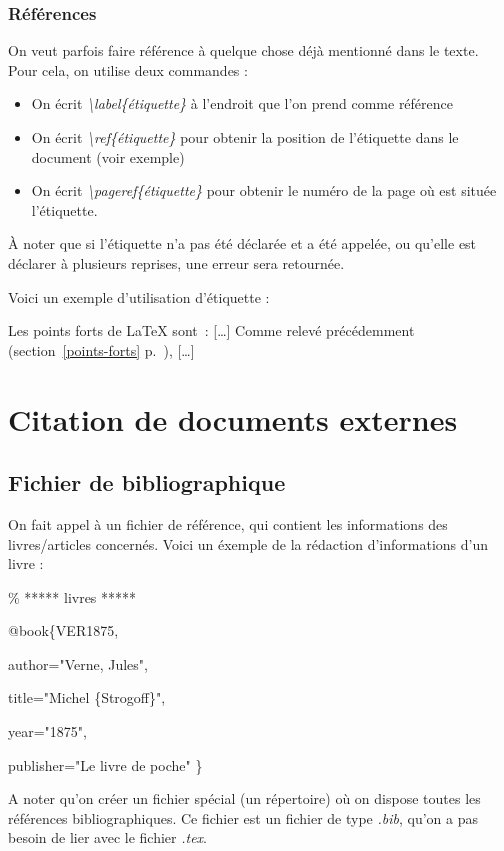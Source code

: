 \documentclass[a4paper,  10pt]{book}
\begin{document}
\subsection{Références}

On veut parfois faire référence à quelque chose déjà mentionné dans le texte. Pour cela, on utilise deux commandes : 
\begin{itemize}

\item On écrit \emph{\textbackslash label\{étiquette\}} à l'endroit que l'on prend comme référence
\item On écrit \emph{\textbackslash ref\{étiquette\}} pour obtenir la position de l'étiquette dans le document (voir exemple)
\item On écrit \emph{\textbackslash pageref\{étiquette\}} pour obtenir le numéro de la page où est située l'étiquette.  

\end{itemize}

À noter que si l'étiquette n'a pas été déclarée et a été appelée, ou qu'elle est déclarer à plusieurs reprises, une erreur sera retournée.

Voici un exemple d'utilisation d'étiquette :

Les points forts de \LaTeX{} sont~:\label{points-forts}
[…]
Comme relevé précédemment (section~\ref{points-forts} p.~\pageref{points-forts}), […]

\chapter{Citation de documents externes}
\section{Fichier de bibliographique}

On fait appel à un fichier de référence, qui contient les informations des livres/articles concernés. Voici un éxemple de la rédaction d'informations d'un livre :

\% ***** livres *****

@book\{VER1875,

   author="Verne, Jules",

   title="Michel \{Strogoff\}",

   year="1875",

   publisher="Le livre de poche"
\}

A noter qu'on créer un fichier spécial (un répertoire) où on dispose toutes les références bibliographiques. Ce fichier est un fichier de type \emph{.bib}, qu'on a pas besoin de lier avec le fichier \emph{.tex}. 
\end{document}
